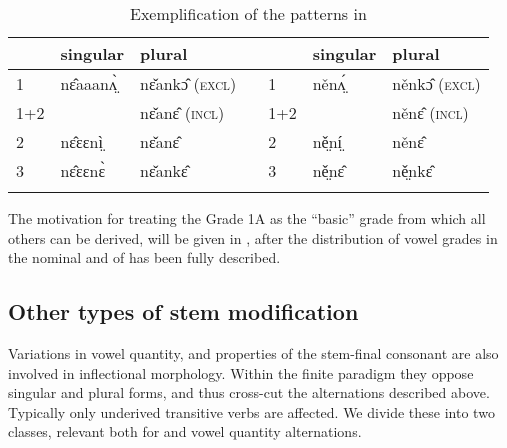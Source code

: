 \documentclass[output=paper,newtxmath,modfonts,nonflat,draftmode]{langsci/langscibook}
\begin{document}
 
\begin{table}
\begin{tabularx}{\textwidth}{lXlXlXl}
\lsptoprule
 & singular & plural &  &  & singular & plural\\
\midrule
 1 & nɛ̂aaanʌ̤̀ & nɛ̌ankɔ̂ (\textsc{excl}) &  & 1 & něnʌ̤́ & něnkɔ̂ (\textsc{excl})\\
 1+2  &        & nɛ̌anɛ̂ (\textsc{incl}) & &  1+2 & & něnɛ̂ (\textsc{incl})\\
 2 & nɛ̂ɛɛnì̤ & nɛ̌anɛ̂ &  & 2 & ně̤ní̤ & něnɛ̂\\
 3 & nɛ̂ɛɛnɛ̀ & nɛ̌ankɛ̂ &  & 3 & ně̤nɛ̂ & ně̤nkɛ̂\\
\lspbottomrule
\end{tabularx}
\caption{Exemplification of the patterns in }
\label{tab:monich:6}
\end{table}

The motivation for treating the Grade 1A as the “basic” grade from which all others can be derived, will be given in , after the distribution of vowel grades in the nominal and  of  has been fully described.

\subsection{Other types of stem modification} %
\label{sec:monich:3.3}

Variations in vowel quantity,  and properties of the stem-final consonant are also involved in inflectional morphology. Within the finite paradigm they oppose singular and plural forms, and thus cross-cut the  alternations described above. Typically only underived transitive verbs are affected. We divide these into two classes, relevant both for  and vowel quantity alternations. 
\end{document}
